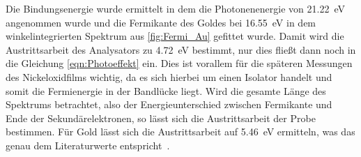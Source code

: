         Die Bindungsenergie wurde ermittelt in dem die Photonenenergie von \SI{21.22}{\electronvolt} angenommen wurde und die Fermikante des Goldes bei \SI{16.55}{\electronvolt} in dem winkelintegrierten Spektrum aus \autoref{fig:Fermi_Au} gefittet wurde.
        Damit wird die Austrittsarbeit des Analysators zu \SI{4.72}{\electronvolt} bestimmt, nur dies fließt dann noch in die Gleichung \ref{eqn:Photoeffekt} ein.
        Dies ist vorallem für die späteren Messungen des Nickeloxidfilms wichtig, da es sich hierbei um einen Isolator handelt und somit die Fermienergie in der Bandlücke liegt.
        Wird die gesamte Länge des Spektrums betrachtet, also der Energieunterschied zwischen Fermikante und Ende der Sekundärelektronen, so lässt sich die Austrittsarbeit der Probe bestimmen.
        Für Gold lässt sich die Austrittsarbeit auf \SI{5.46}{\electronvolt} ermitteln, was das genau dem Literaturwerte entspricht~\cite{5A_4}.
   
